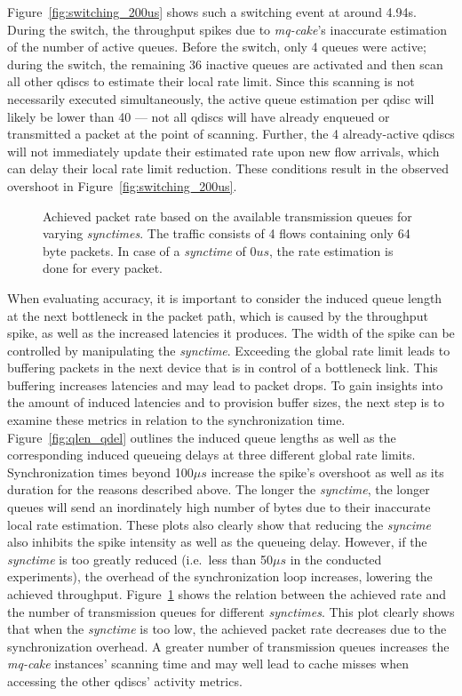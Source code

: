 Figure~\ref{fig:switching_200us} shows such a switching event at around 4.94s.
%
During the switch, the throughput spikes due to \textit{mq-cake}'s inaccurate estimation of the number of active queues.
%
Before the switch, only 4 queues were active; during the switch, the remaining 36 inactive queues are activated and then scan all other qdiscs to estimate their local rate limit.
%
Since this scanning is not necessarily executed simultaneously, the active queue estimation per qdisc will likely be lower than 40 --- not all qdiscs will have already enqueued or transmitted a packet at the point of scanning.
%
Further, the 4 already-active qdiscs will not immediately update their estimated rate upon new flow arrivals, which can delay their local rate limit reduction.
%
These conditions result in the observed overshoot in Figure~\ref{fig:switching_200us}.
%

\begin{figure}[h]
    \centering
    
    \caption{Achieved packet rate based on the available transmission queues for varying \textit{synctimes}. The traffic consists of 4 flows containing only 64 byte packets. In case of a \textit{synctime} of $0us$, the rate estimation is done for every packet.}\label{fig:sync_txq_64}
\end{figure}
%
When evaluating accuracy, it is important to consider the induced queue length at the next bottleneck in the packet path, which is caused by the throughput spike, as well as the increased latencies it produces.
%
The width of the spike can be controlled by manipulating the \textit{synctime}.
%
Exceeding the global rate limit leads to buffering packets in the next device that is in control of a bottleneck link.
%
This buffering increases latencies and may lead to packet drops.
%
To gain insights into the amount of induced latencies and to provision buffer sizes, the next step is to examine these metrics in relation to the synchronization time. 
%
Figure~\ref{fig:qlen_qdel} outlines the induced queue lengths as well as the corresponding induced queueing delays at three different global rate limits.
%
Synchronization times beyond 100$\mu s$ increase the spike's overshoot as well as its duration for the reasons described above.
%
The longer the \textit{synctime}, the longer queues will send an inordinately high number of bytes due to their inaccurate local rate estimation.
%
These plots also clearly show that reducing the \textit{syncime} also inhibits the spike intensity as well as the queueing delay.
%
However, if the \textit{synctime} is too greatly reduced (i.e.\ less than 50$\mu s$ in the conducted experiments), the overhead of the synchronization loop increases, lowering the achieved throughput.
%
Figure~\ref{fig:sync_txq_64} shows the relation between the achieved rate and the number of transmission queues for different \textit{synctimes}.
%
This plot clearly shows that when the \textit{synctime} is too low, the achieved packet rate decreases due to the synchronization overhead.
%
A greater number of transmission queues increases the \textit{mq-cake} instances' scanning time and may well lead to cache misses when accessing the other qdiscs' activity metrics.
%

